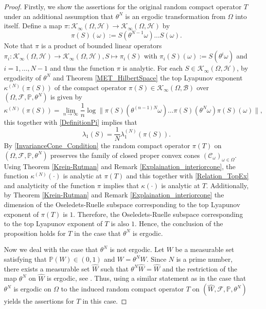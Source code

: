 \documentclass[pdflatex,sn-mathphys-num]{sn-jnl}%
\theoremstyle{thmstyleone}%
\theoremstyle{thmstyletwo}%
\theoremstyle{thmstylethree}%
\newcommand{\mP}{\mathbb{P}}
\newcommand{\cH}{\mathcal{H}}
\newcommand{\cF}{\mathcal{F}}
\newcommand{\cC}{\mathcal{C}}
\numberwithin{equation}{section}
\begin{document}
\begin{proof}
Firstly, we show the assertions for the original random compact operator $T$ under an additional assumption that  $\theta^N$ is an ergodic transformation from $\Omega$ into itself. Define a map $\pi: \mathcal K_{\infty}(\Omega,\cH)\rightarrow \mathcal K_{\infty}(\Omega,\cH)$ by
\begin{equation}\label{DefinitionPi}
\pi(S)(\omega):=S(\theta^{N-1}\omega)\dots S(\omega).
\end{equation}
Note that $\pi$ is a product of bounded linear operators $\pi_i:\mathcal K_{\infty}(\Omega,\cH)\rightarrow \mathcal K_{\infty}(\Omega,\cH), S\mapsto \pi_i(S)$ with $\pi_i(S)(\omega):=S(\theta^i\omega)$ and $i=1,\dots, N-1$ and thus the function $\pi$ is analytic. For each $S\in \mathcal K_{\infty}(\Omega,\cH)$, by ergodicity of $\theta^N$ and Theorem \ref{MET_HilbertSpace}  the top Lyapunov exponent $\kappa^{(N)}(\pi(S))$ of  the compact operator  $\pi(S)\in \mathcal K_{\infty}(\Omega,\mathcal B)$ over $(\Omega,\cF,\mP,\theta^N)$ is given by 
\[
\kappa^{(N)}(\pi(S))
=
\lim_{n\to\infty}\frac{1}{n}\log \|\pi(S)(\theta^{(n-1)N}\omega)\dots\pi(S)(\theta^N\omega)\pi(S)(\omega)\|,
\]
this together with  \eqref{DefinitionPi} implies that
\begin{equation}\label{Relation_TopEx}
\lambda_1(S)=\frac{1}{N}\lambda_1^{(N)}(\pi(S)).
\end{equation}
By \eqref{InvarianceCone_Condition} the random compact operator $\pi(T)$ on $(\Omega,\cF,\mP,\theta^N)$ preserves the family of closed proper convex cones $(\cC_{\omega})_{\omega\in\Omega}$. Using Theorem \ref{Krein-Rutman} and Remark \ref{Explaination_interiorcone}, the function $\kappa^{(N)}(\cdot)$ is analytic at $\pi(T)$ and this together with \eqref{Relation_TopEx} and analyticity of the function $\pi$ implies that $\kappa(\cdot)$ is analytic at $T$. Additionally, by Theorem \ref{Krein-Rutman} and Remark \ref{Explaination_interiorcone} the dimension of the Oseledets-Ruelle subspace corresponding to the top Lyapunov exponent of $\pi(T)$ is $1$. Therefore, the  Oseledets-Ruelle subspace corresponding to the top Lyapunov exponent of $T$ is also  $1$. Hence, the conclusion of the proposition holds for $T$ in the case that $\theta^N$ is ergodic.

Now we deal with the case that $\theta^N$ is not ergodic. Let $W$ be a measurable set satisfying that
$\mP(W)\in (0,1)$ and  $W=\theta^N W$. Since $N$ is a prime number, there exists a measurable set  $\widehat W$ such that $\theta^N \widehat W=\widehat W$ and the restriction of the map $\theta^N$ on
 $\widehat W$ is ergodic, see \cite[Proof of Theorem 4]{Doan17}. Thus, using a similar statement as in the case that $\theta^N$ is ergodic on $\Omega$ to the induced random compact operator $T$ on $(\widehat W,\mathcal F,\mP,\theta^N)$ yields the assertions for $T$ in this case.


\end{proof}
\end{document}
